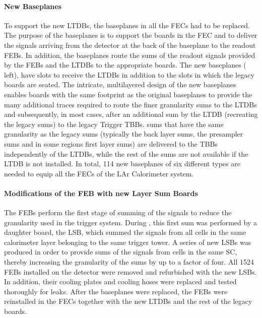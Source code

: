 \documentclass[cernpreprint, atlasdraft=false, UKenglish,british,orcidlogo, texmf, orcidlogo]{atlasdoc}
\begin{document}
\paragraph{New Baseplanes}
To support the new \glspl{LTDB}, the baseplanes in all the \glspl{FEC} had to be replaced.
The purpose of the baseplanes is to support the boards in the \gls{FEC} and to deliver the
signals arriving from the detector at the back of the baseplane to the readout \glspl{FEB}. In addition, the baseplanes route
the \analog sums of the readout signals provided by the \glspl{FEB} and the \glspl{LTDB} to the appropriate boards.
The new baseplanes (\Fig{\ref{fig:larLTDB}} left), have slots to receive the \glspl{LTDB} in addition to the slots in
which the legacy boards are seated. The intricate, multilayered design of the new baseplanes enables boards with the same
footprint as the original baseplanes to provide the many additional traces required to route the finer granularity
\analog sums to the \glspl{LTDB} and subsequently, in most cases, after an additional sum by the \gls{LTDB} (recreating the legacy \analog sums)
to the legacy Trigger \glspl{TBB}. \Analog sums that have the same granularity as the legacy sums (typically the back layer sums,
the presampler sums and in some regions first layer sums) are delivered to the \glspl{TBB} independently of the \glspl{LTDB},
while the rest of the sums are not available if the \gls{LTDB} is not installed.
In total, 114 new baseplanes of six different types are needed to equip all the \glspl{FEC} of the \gls{LAr} Calorimeter system.
 
 
\paragraph{Modifications of the FEB with new Layer Sum Boards} The \glspl{FEB} perform the first stage of \analog summing
of the signals to reduce the granularity used in the trigger system.
During \RunOneTwo, this first sum was performed by a daughter board, the \gls{LSB},
which summed the signals from all cells in the same calorimeter layer belonging to the same trigger tower. A series
of new \glspl{LSB} was produced in order to provide sums of the signals from cells in the same \gls{SC},
thereby increasing the granularity of the sums by up to a factor of four.
All 1524 \glspl{FEB} installed on the detector were removed and refurbished with the new \glspl{LSB}.
In addition, their cooling plates and cooling hoses were replaced and tested thoroughly for leaks.
After the baseplanes were replaced, the \glspl{FEB} were reinstalled
in the \glspl{FEC} together with the new \glspl{LTDB} and the rest of the legacy boards.
 
\end{document}
